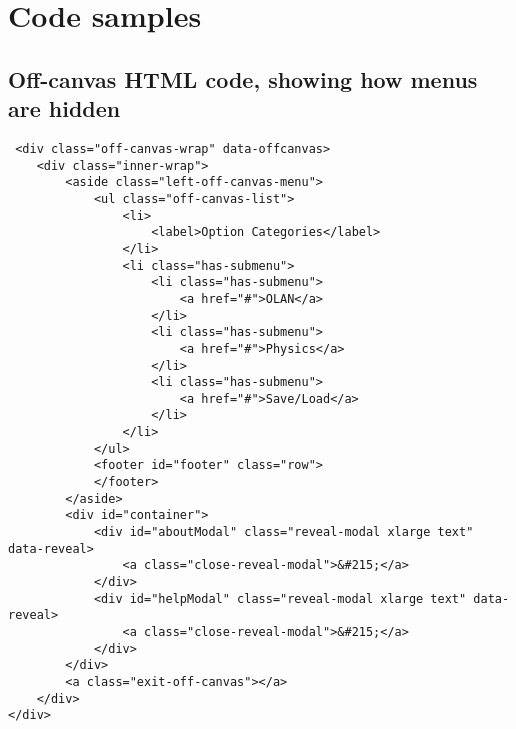 \chapter{Code samples}

\section{Off-canvas HTML code, showing how menus are hidden }
\label{code:canvas}
\begin{lstlisting}
 <div class="off-canvas-wrap" data-offcanvas>
    <div class="inner-wrap">
        <aside class="left-off-canvas-menu">
            <ul class="off-canvas-list">
                <li>
                    <label>Option Categories</label>
                </li>
                <li class="has-submenu">
                    <li class="has-submenu">
                        <a href="#">OLAN</a>
                    </li>
                    <li class="has-submenu">
                        <a href="#">Physics</a>
                    </li>
                    <li class="has-submenu">
                        <a href="#">Save/Load</a>
                    </li>
                </li>
            </ul>
            <footer id="footer" class="row">
            </footer>
        </aside>
        <div id="container">
            <div id="aboutModal" class="reveal-modal xlarge text" data-reveal>                        
                <a class="close-reveal-modal">&#215;</a>
            </div>
            <div id="helpModal" class="reveal-modal xlarge text" data-reveal>
                <a class="close-reveal-modal">&#215;</a>
            </div>
        </div>
        <a class="exit-off-canvas"></a>
    </div>
</div>
 
\end{lstlisting}

